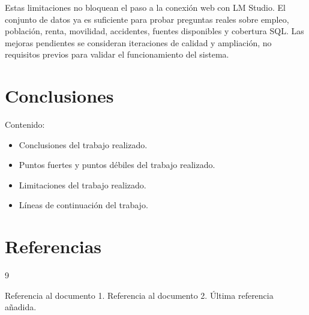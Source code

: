 Estas limitaciones no bloquean el paso a la conexión web con LM Studio. El conjunto de datos ya es suficiente para probar preguntas reales sobre empleo, población, renta, movilidad, accidentes, fuentes disponibles y cobertura SQL. Las mejoras pendientes se consideran iteraciones de calidad y ampliación, no requisitos previos para validar el funcionamiento del sistema.

\chapter{Conclusiones}

Contenido:

\begin{itemize}
\item Conclusiones del trabajo realizado.
\item Puntos fuertes y puntos débiles del trabajo realizado.
\item Limitaciones del trabajo realizado.
\item Líneas de continuación del trabajo.
\end{itemize}

\chapter*{Referencias}
\begin{thebibliography}{9}

 Referencia al documento 1.
 Referencia al documento 2.
 Última referencia añadida.
\end{thebibliography}
